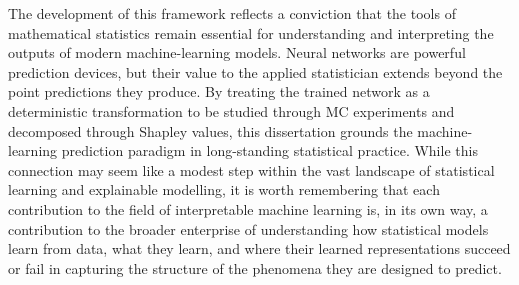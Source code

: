 The development of this framework reflects a conviction that the tools of
mathematical statistics remain essential for understanding and interpreting
the outputs of modern machine-learning models.  Neural networks are
powerful prediction devices, but their value to the applied statistician
extends beyond the point predictions they produce.  By treating the trained
network as a deterministic transformation to be studied through MC
experiments and decomposed through Shapley values, this dissertation
grounds the machine-learning prediction paradigm in long-standing
statistical practice.  While this connection may seem like a modest step within the
vast landscape of statistical learning and explainable modelling, it is
worth remembering that each contribution to the field of interpretable
machine learning is, in its own way, a contribution to the broader
enterprise of understanding how statistical models learn from data, what
they learn, and where their learned representations succeed or fail in
capturing the structure of the phenomena they are designed to predict.

